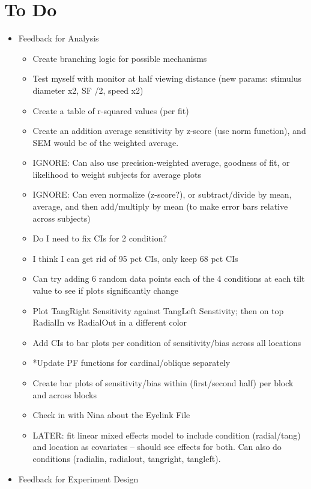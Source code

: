\documentclass[11pt]{article} %
\begin{document}
\section{To Do} 
\begin{itemize}
\item Feedback for Analysis
	\begin{itemize}
	\item Create branching logic for possible mechanisms
	\item Test myself with monitor at half viewing distance (new params: stimulus diameter x2, SF /2, speed x2)
	\item Create a table of r-squared values (per fit)
	\item Create an addition average sensitivity by z-score (use norm function), and SEM would be of the weighted average.
	\item IGNORE: Can also use precision-weighted average, goodness of fit, or likelihood to weight subjects for average plots
	\item IGNORE: Can even normalize (z-score?), or subtract/divide by mean, average, and then add/multiply by mean (to make error bars relative across subjects)
	\item Do I need to fix CIs for 2 condition?
	\item I think I can get rid of 95 pct CIs, only keep 68 pct CIs
	\item Can try adding 6 random data points each of the 4 conditions at each tilt value to see if plots significantly change
	\item Plot TangRight Sensitivity against TangLeft Senstivity; then on top RadialIn vs RadialOut in a different color
	\item Add CIs to bar plots per condition of sensitivity/bias across all locations
	\item *Update PF functions for cardinal/oblique separately
	\item Create bar plots of sensitivity/bias within (first/second half) per block and across blocks
	\item Check in with Nina about the Eyelink File
	\item LATER: fit linear mixed effects model to include condition (radial/tang) and location as covariates -- should see effects for both. Can also do conditions (radialin, radialout, tangright, tangleft).
	\end{itemize}
\item Feedback for Experiment Design
	\begin{itemize}

\end{itemize}
\end{itemize}
\end{document}
